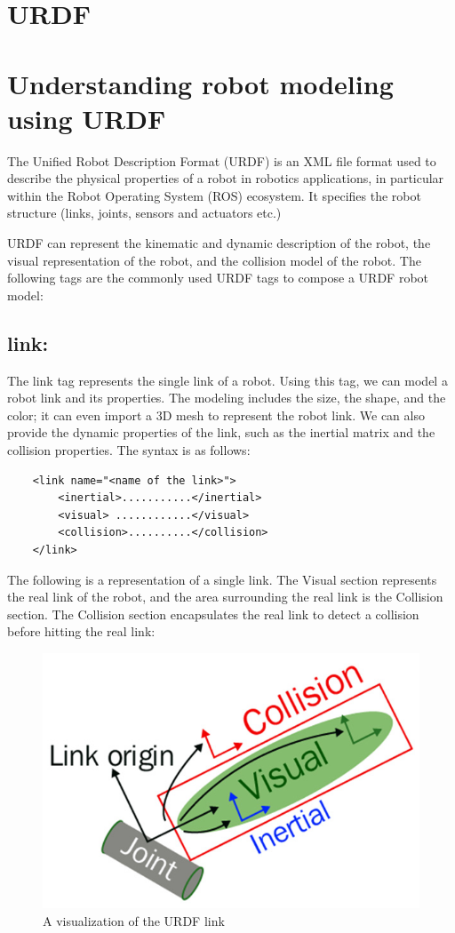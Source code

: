 \documentclass[../../main]{subfiles}
\begin{document}
\lstset{language=XML}
\section{URDF}
\section{Understanding robot modeling using URDF}
The Unified Robot Description Format (URDF) is an XML file format used to describe the physical properties of a robot in robotics applications, in particular within the Robot Operating System (ROS) ecosystem. It specifies the robot structure (links, joints, sensors and actuators etc.)

URDF can represent the kinematic and dynamic description of the robot, the visual
representation of the robot, and the collision model of the robot.
The following tags are the commonly used URDF tags to compose a URDF robot model:

\subsection{link:}
The link tag represents the single link of a robot. Using this tag, we can
model a robot link and its properties. The modeling includes the size, the shape,
and the color; it can even import a 3D mesh to represent the robot link. We can
also provide the dynamic properties of the link, such as the inertial matrix and the
collision properties.
The syntax is as follows:
\\
% 
\begin{verbatim}
    <link name="<name of the link>">
        <inertial>...........</inertial>
        <visual> ............</visual>
        <collision>..........</collision>
    </link>
\end{verbatim}
The following is a representation of a single link. The Visual section represents the
real link of the robot, and the area surrounding the real link is the Collision section.
The Collision section encapsulates the real link to detect a collision before hitting
the real link:
\begin{figure}[h]
\centering
\includegraphics{sublatex/hashem/img/link1.jpg}
\caption{A visualization of the URDF link\cite{joseph2018mastering}}
\end{figure}
\end{document}
